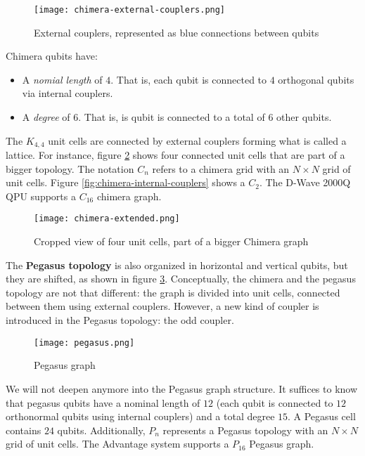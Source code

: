 \begin{figure}[h]
	\texttt{[image: chimera-external-couplers.png]}
	\centering
	\caption{External couplers, represented as blue connections between qubits \cite{DWaveDoc-Architecture}}
	\label{fig:chimera-external-couplers}
\end{figure}

Chimera qubits have:

\begin{itemize}
	\item A \emph{nomial length} of $4$. That is, each qubit is connected to $4$ orthogonal qubits via internal couplers.
	\item A \emph{degree} of $6$. That is, is qubit is connected to a total of $6$ other qubits.
\end{itemize}

The $K_{4,4}$ unit cells are connected by external couplers forming what is called a lattice. For instance, figure \ref{fig:chimera-extended} shows four connected unit cells that are part of a bigger topology. The notation $C_n$ refers to a chimera grid with an $N \times N$ grid of unit cells. Figure \ref{fig:chimera-internal-couplers} shows a $C_2$. The D-Wave 2000Q QPU supports a $C_{16}$ chimera graph.

\begin{figure}[h]
	\texttt{[image: chimera-extended.png]}
	\centering
	\caption{Cropped view of four unit cells, part of a bigger Chimera graph \cite{DWaveDoc-Architecture}}
	\label{fig:chimera-extended}
\end{figure}

The \textbf{Pegasus topology} is also organized in horizontal and vertical qubits, but they are shifted, as shown in figure \ref{fig:pegasus}. Conceptually, the chimera and the pegasus topology are not that different: the graph is divided into unit cells, connected between them using external couplers. However, a new kind of coupler is introduced in the Pegasus topology: the odd coupler.

\begin{figure}[h]
	\texttt{[image: pegasus.png]}
	\centering
	\caption{Pegasus graph \cite{DWaveDoc-Architecture}}
	\label{fig:pegasus}
\end{figure}

We will not deepen anymore into the Pegasus graph structure. It suffices to know that pegasus qubits have a nominal length of $12$ (each qubit is connected to $12$ orthonormal qubits using internal couplers) and a total degree $15$. A Pegasus cell contains $24$ qubits. Additionally, $P_n$ represents a Pegasus topology with an $N \times N$ grid of unit cells. The Advantage system supports a $P_{16}$ Pegasus graph.


